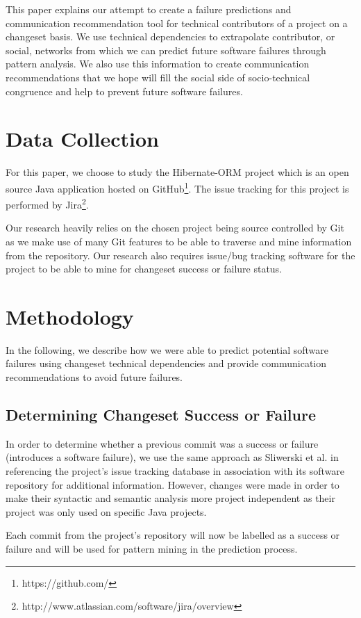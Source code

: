 \documentclass[conference]{IEEEtran}
\begin{document}
This paper explains our attempt to create a failure predictions and communication recommendation 
tool for technical contributors of a project on a changeset basis. We use technical dependencies 
to extrapolate contributor, or social, networks from which we can predict future software failures 
through pattern analysis. We also use this information to create communication recommendations
that we hope will fill the social side of socio-technical congruence and help to prevent future
software failures. 


\section{Data Collection}
For this paper, we choose to study the Hibernate-ORM project which is an open source Java 
application hosted on GitHub\footnote{https://github.com/}. 
The issue tracking for this project is performed by Jira\footnote{http://www.atlassian.com/software/jira/overview}.

Our research heavily relies on the chosen project being source controlled by Git as we make use of many
Git features to be able to traverse and mine information from the repository. Our research also
requires issue/bug tracking software for the project to be able to mine for changeset success or
failure status.


\section{Methodology}
In the following, we describe how we were able to predict potential software failures using changeset
technical dependencies and provide communication recommendations to avoid future failures.

\subsection{Determining Changeset Success or Failure}
In order to determine whether a previous commit was a success or failure (introduces a software
failure), we use the same approach as Sliwerski et al. \cite{Sliwerski:2005:CIF} in referencing 
the project's issue tracking database in association with its software repository for additional 
information. However, changes were made in order to make their syntactic  and semantic analysis 
more project independent as their project was only used on specific Java projects. 

Each commit from the project's repository will now be labelled as a success
or failure and will be used for pattern mining in the prediction process.
\end{document}
